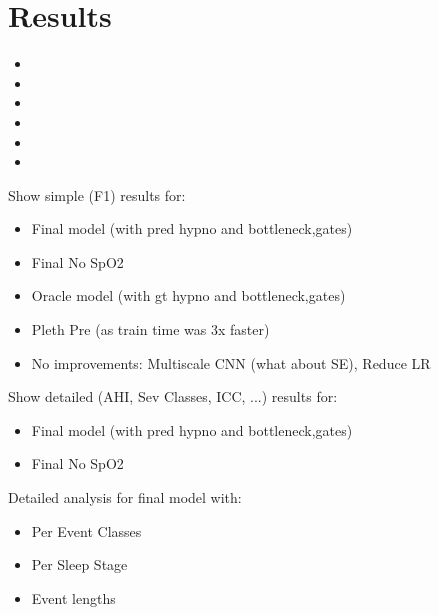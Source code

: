 \chapter{Results \label{Chapter-Results}}

\begin{itemize}
    \item {} %
    \item {} %
    \item {} %
    \item {} %
    \item {} %
    \item {} %
\end{itemize}

Show simple (F1) results for:
\begin{itemize}
    \item Final model (with pred hypno and bottleneck,gates)
    \item Final No SpO2
    \item Oracle model (with gt hypno and bottleneck,gates)
    \item Pleth Pre (as train time was 3x faster)
    \item No improvements: Multiscale CNN (what about SE), Reduce LR
\end{itemize}

Show detailed (AHI, Sev Classes, ICC, ...) results for:
\begin{itemize}
    \item Final model (with pred hypno and bottleneck,gates)
    \item Final No SpO2
\end{itemize}

Detailed analysis for final model with:
\begin{itemize}
    \item Per Event Classes
    \item Per Sleep Stage
    \item Event lengths
\end{itemize}
